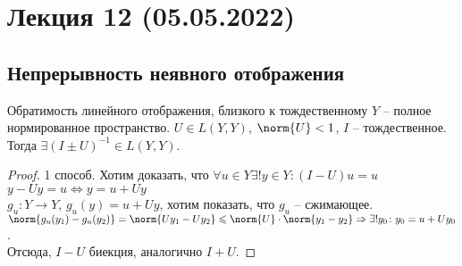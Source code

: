 \section*{Лекция 12 (05.05.2022)}

\subsection{Непрерывность неявного отображения}

\begin{namedlemma}{Обратимость линейного отображения, близкого к тождественному}
    $Y$ -- полное нормированное пространство. $U \in L(Y, Y)$, $\norm{U} < 1$, $I$ -- тождественное. Тогда $\exists (I \pm U)^{-1} \in L(Y, Y)$.
\end{namedlemma}
\begin{proof}
    \item[1 способ.] Хотим доказать, что $\forall u \in Y \exists! y \in Y \colon (I - U)u = u$ \\
    $y - Uy = u \Leftrightarrow y = u + Uy$\\
    $g_u \colon Y \to Y$, $g_u(y) = u + Uy$, хотим показать, что $g_u$ -- сжимающее.\\
    $\norm{g_u(y_1) - g_u(y_2)} = \norm{Uy_1 - Uy_2} \leqslant \norm{U} \cdot \norm{y_1 - y_2} \Rightarrow \exists! y_0 \colon y_0 = u + Uy_0$. \\
    Отсюда, $I - U$ биекция, аналогично $I + U$.


\end{proof}
